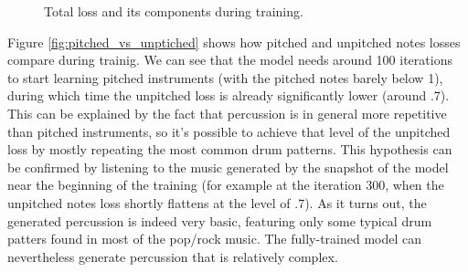 \documentclass[en]{pracamgr}
\begin{document}
\begin{figure}
    \centering
    \caption{Total loss and its components during training.}
    \label{fig:total}
\end{figure}

Figure \ref{fig:pitched_vs_unptiched} shows how pitched and unpitched notes losses compare during trainig.
We can see that the model needs around 100 iterations to start learning pitched instruments (with the pitched notes barely below 1), during which time the unpitched loss is already significantly lower (around .7).
This can be explained by the fact that percussion is in general more repetitive than pitched instruments, so it's possible to achieve that level of the unpitched loss by mostly repeating the most common drum patterns.
This hypothesis can be confirmed by listening to the music generated by the snapshot of the model near the beginning of the training (for example at the iteration 300, when the unpitched notes loss shortly flattens at the level of .7).
As it turns out, the generated percussion is indeed very basic, featuring only some typical drum patters found in most of the pop/rock music.
The fully-trained model can nevertheless generate percussion that is relatively complex.
\end{document}
